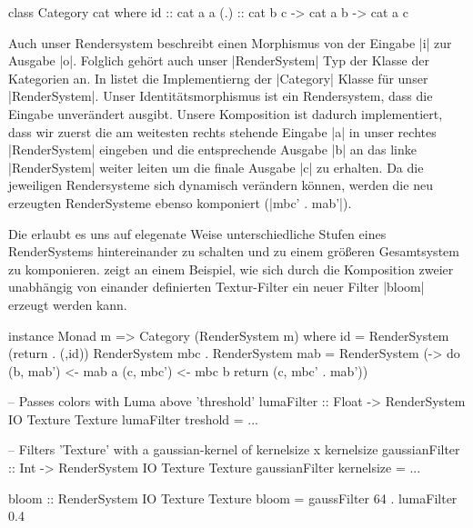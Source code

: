 \begin{haskell}[label={lst:class-category},caption={Category Klasse\protect\footnotemark},nolol,float,floatplacement=H]
class Category cat where
  id :: cat a a
  (.) :: cat b c -> cat a b -> cat a c
\end{haskell}

Auch unser Rendersystem beschreibt einen Morphismus von der Eingabe |i| zur Ausgabe |o|. Folglich gehört auch unser |RenderSystem| Typ der Klasse der Kategorien an. In  listet die Implementierng der |Category| Klasse für unser |RenderSystem|. Unser Identitätsmorphismus ist ein Rendersystem, dass die Eingabe unverändert ausgibt. Unsere Komposition ist dadurch implementiert, dass wir zuerst die am weitesten rechts stehende Eingabe |a| in unser rechtes |RenderSystem| eingeben und die entsprechende Ausgabe |b| an das linke |RenderSystem| weiter leiten um die finale Ausgabe |c| zu erhalten. Da die jeweiligen Rendersysteme sich dynamisch verändern können, werden die neu erzeugten RenderSysteme ebenso komponiert (|mbc' . mab'|). 

Die erlaubt es uns auf elegenate Weise unterschiedliche Stufen eines RenderSystems hintereinander zu schalten und zu einem größeren Gesamtsystem zu komponieren.  zeigt an einem Beispiel, wie sich durch die Komposition zweier unabhängig von einander definierten Textur-Filter ein neuer Filter |bloom| erzeugt werden kann.

\begin{haskell}[label={lst:rendersystem-category},caption={Category Instanz für RenderSystem}]
instance Monad m => Category (RenderSystem m) where
  id = RenderSystem (return . (,id))
  RenderSystem mbc . RenderSystem mab = RenderSystem (\a -> do
    (b, mab') <- mab a
    (c, mbc') <- mbc b
    return (c, mbc' . mab'))
\end{haskell}

\begin{haskell}[label={lst:rendersystem-komposition-beispiel},caption={Beispiel einer Komposition von RenderSystem}]
-- Passes colors with Luma above 'threshold'
lumaFilter :: Float -> RenderSystem IO Texture Texture
lumaFilter treshold = ...

-- Filters 'Texture' with a gaussian-kernel of kernelsize x kernelsize
gaussianFilter :: Int -> RenderSystem IO Texture Texture
gaussianFilter kernelsize = ...

bloom :: RenderSystem IO Texture Texture
bloom = gaussFilter 64 . lumaFilter 0.4
\end{haskell}


